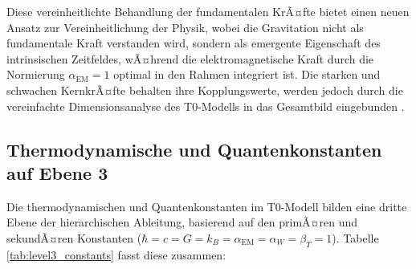 ﻿\documentclass[twocolumn,aps,prl]{revtex4-2}
\begin{document}
{{{{{{{{{{{													Diese vereinheitlichte Behandlung der fundamentalen KrÃ¤fte bietet einen neuen Ansatz zur Vereinheitlichung der Physik, wobei die Gravitation nicht als fundamentale Kraft verstanden wird, sondern als emergente Eigenschaft des intrinsischen Zeitfeldes, wÃ¤hrend die elektromagnetische Kraft durch die Normierung \(\alpha_{\text{EM}} = 1\) optimal in den Rahmen integriert ist. Die starken und schwachen KernkrÃ¤fte behalten ihre Kopplungswerte, werden jedoch durch die vereinfachte Dimensionsanalyse des T0-Modells in das Gesamtbild eingebunden \cite{pascher_emergente_2025}.
													
													\subsection{Thermodynamische und Quantenkonstanten auf Ebene 3}
													\label{subsec:level3_thermo_quantum}
													
													Die thermodynamischen und Quantenkonstanten im T0-Modell bilden eine dritte Ebene der hierarchischen Ableitung, basierend auf den primÃ¤ren und sekundÃ¤ren Konstanten (\(\hbar = c = G = k_B = \alpha_{\text{EM}} = \alpha_W = \beta_T = 1\)). Tabelle \ref{tab:level3_constants} fasst diese zusammen:
													
}}}}}}}}}}}
\end{document}
